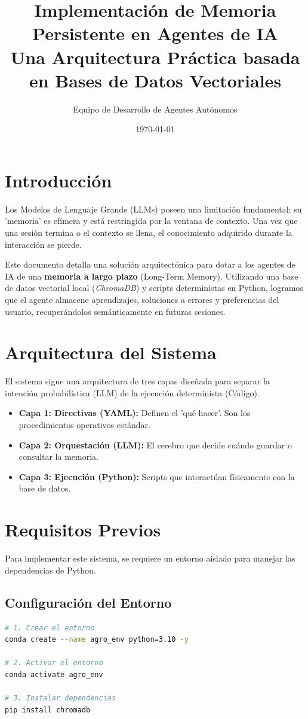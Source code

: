 \documentclass[12pt, a4paper]{article}
\title{\textbf{Implementación de Memoria Persistente en Agentes de IA}\\
\large Una Arquitectura Práctica basada en Bases de Datos Vectoriales}
\author{Equipo de Desarrollo de Agentes Autónomos}
\date{\today}
\begin{document}
\maketitle
\tableofcontents
\newpage

\section{Introducción}
Los Modelos de Lenguaje Grande (LLMs) poseen una limitación fundamental: su 'memoria' es efímera y está restringida por la ventana de contexto. Una vez que una sesión termina o el contexto se llena, el conocimiento adquirido durante la interacción se pierde.

Este documento detalla una solución arquitectónica para dotar a los agentes de IA de una \textbf{memoria a largo plazo} (Long-Term Memory). Utilizando una base de datos vectorial local (\textit{ChromaDB}) y scripts deterministas en Python, logramos que el agente almacene aprendizajes, soluciones a errores y preferencias del usuario, recuperándolos semánticamente en futuras sesiones.

\section{Arquitectura del Sistema}
El sistema sigue una arquitectura de tres capas diseñada para separar la intención probabilística (LLM) de la ejecución determinista (Código).

\begin{itemize}
    \item \textbf{Capa 1: Directivas (YAML):} Definen el 'qué hacer'. Son los procedimientos operativos estándar.
    \item \textbf{Capa 2: Orquestación (LLM):} El cerebro que decide cuándo guardar o consultar la memoria.
    \item \textbf{Capa 3: Ejecución (Python):} Scripts que interactúan físicamente con la base de datos.
\end{itemize}

\section{Requisitos Previos}
Para implementar este sistema, se requiere un entorno aislado para manejar las dependencias de Python.

\subsection{Configuración del Entorno}
\begin{lstlisting}[language=bash, caption=Creación del entorno con Conda]
# 1. Crear el entorno
conda create --name agro_env python=3.10 -y

# 2. Activar el entorno
conda activate agro_env

# 3. Instalar dependencias
pip install chromadb
\end{lstlisting}
\end{document}
